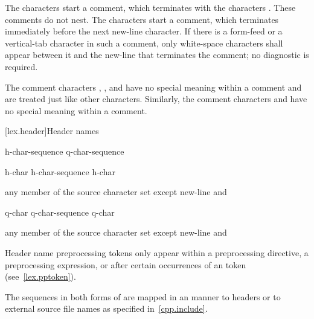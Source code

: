 \documentclass{wg21}
\begin{document}
\pnum
{}%
%
%
The characters \tcode{/*} start a comment, which terminates with the
characters \tcode{*/}. These comments do not nest.
%
The characters \tcode{//} start a comment, which terminates immediately before the
next new-line character. If there is a form-feed or a vertical-tab
character in such a comment, only white-space characters shall appear
between it and the new-line that terminates the comment; no diagnostic
is required.
\begin{note}
    The comment characters \tcode{//}, \tcode{/*},
    and \tcode{*/} have no special meaning within a \tcode{//} comment and
    are treated just like other characters. Similarly, the comment
    characters \tcode{//} and \tcode{/*} have no special meaning within a
    \tcode{/*} comment.
\end{note}

[lex.header]{Header names}

%
\begin{bnf}
    \br
    \terminal{<} h-char-sequence \terminal{>}\br
     q-char-sequence 
\end{bnf}

\begin{bnf}
    \br
    h-char\br
    h-char-sequence h-char
\end{bnf}

\begin{bnf}
    \br
    \textnormal{any member of the source character set except new-line and \terminal{>}}
\end{bnf}

\begin{bnf}
    \br
    q-char\br
    q-char-sequence q-char
\end{bnf}

\begin{bnf}
    \br
    \textnormal{any member of the source character set except new-line and }
\end{bnf}

\pnum
\begin{note}
    Header name preprocessing tokens only appear within
    a  preprocessing directive,
    a  preprocessing expression, or
    after certain occurrences of an  token
    (see~\ref{lex.pptoken}).
\end{note}
The sequences in both forms of  are mapped in an
 manner to headers or to
external source file names as specified in~\ref{cpp.include}.
\end{document}
